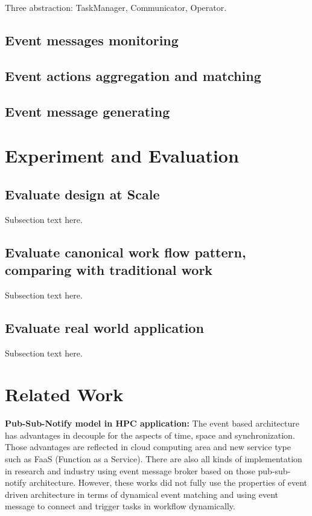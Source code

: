 \documentclass[10pt, conference, compsocconf]{IEEEtran}
\begin{document}
Three abstraction: TaskManager, Communicator, Operator.

\subsection{Event messages monitoring}
\subsection{Event actions aggregation and matching}
\subsection{Event message generating}

\section{Experiment and Evaluation}

\subsection{Evaluate design at Scale}
Subsection text here.

\subsection{Evaluate canonical work flow pattern, comparing with traditional work}
Subsection text here.

\subsection{Evaluate real world application}
Subsection text here.


\section{Related Work}

\textbf{Pub-Sub-Notify model in HPC application:}
The event based architecture has advantages in decouple for the aspects of time, space and synchronization\cite{eugster2003many}. Those advantages are reflected in cloud computing area and new service type such as FaaS (Function as a Service)\cite{fox2017status}. There are also all kinds of implementation in research and industry using event message broker based on those pub-sub-notify architecture\cite{hivemq,jin2012scalable}. However, these works did not fully use the properties of event driven architecture in terms of dynamical event matching and using event message to connect and trigger tasks in workflow dynamically. 
\end{document}
